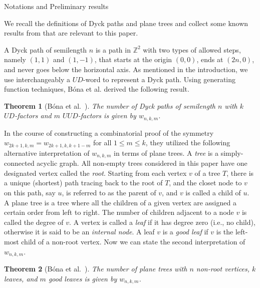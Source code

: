 \documentclass[reqno]{amsart}
\makeatletter
\numberwithin{equation}{section}
\newtheorem{theorem}{Theorem}[section]
\theoremstyle{definition}
\theoremstyle{named}
\def\section{\@startsection{section}{1}%
  \z@{.7\linespacing\@plus\linespacing}{.5\linespacing}%
  {\normalfont\scshape}}%
\newcommand{\bZ}{\mathbb{Z}}
\makeatother
\begin{document}
\section{Notations and Preliminary results}\label{sec:notation}

We recall the definitions of Dyck paths and plane trees and collect some known results from \cite{BDL2022} that are relevant to this paper.

A Dyck path of semilength $n$ is a path in $\bZ^2$ with two types of allowed steps, namely $(1,1)$ and $(1,-1)$, that starts at the origin $(0,0)$, ends at $(2n,0)$, and never goes below the horizontal axis. As mentioned in the introduction, we use interchangeably a $UD$-word to represent a Dyck path. Using generating function techniques, B\'ona et al. derived the following result.
\begin{theorem}[{B\'ona et al.~\cite[Thm.~1.2]{BDL2022}}]\label{thm:path}
The number of Dyck paths of semilength $n$ with $k$ $UD$-factors and $m$ $UUD$-factors is given by $w_{n,k,m}$.
\end{theorem}
In the course of constructing a combinatorial proof of the symmetry $w_{2k+1,k,m}=w_{2k+1,k,k+1-m}$ for all $1\le m\le k$, they utilized the following alternative interpretation of $w_{n,k,m}$ in terms of plane trees. A {\it tree} is a simply-connected acyclic graph. All non-empty trees considered in this paper have one designated vertex called the {\it root}. Starting from each vertex $v$ of a tree $T$, there is a unique (shortest) path tracing back to the root of $T$, and the closet node to $v$ on this path, say $u$, is referred to as the parent of $v$, and $v$ is called a child of $u$. A plane tree is a tree where all the children of a given vertex are assigned a certain order from left to right. The number of children adjacent to a node $v$ is called the degree of $v$. A vertex is called a {\it leaf} if it has degree zero (i.e., no child), otherwise it is said to be an {\it internal node}. A leaf $v$ is a {\it good leaf} if $v$ is the left-most child of a non-root vertex. Now we can state the second interpretation of $w_{n,k,m}$.

\begin{theorem}[{B\'ona et al.~\cite[Prop.~3.1]{BDL2022}}]\label{thm:tree-1}
The number of plane trees with $n$ non-root vertices, $k$ leaves, and $m$ good leaves is given by $w_{n,k,m}$.
\end{theorem}
\end{document}
